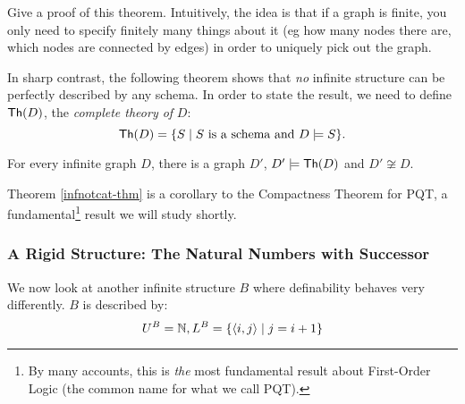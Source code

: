 \begin{aside}
    Give a proof of this theorem. Intuitively, the idea is that if a graph is finite, you only need to specify finitely many things about it (eg how many nodes there are, which nodes are connected by edges) in order to uniquely pick out the graph. 
\end{aside}

In sharp contrast, the following theorem shows that \emph{no} infinite structure can be perfectly described by any schema. In order to state the result, we need to define $\mbox{${\mathsf{Th}}(D)$}$, the \emph{complete theory of} $D$:
\[
\mbox{${\mathsf{Th}}(D)$} = \{S\mid S \mbox{ is a schema and } D\models S\}. 
\]
\begin{theorem}\label{infnotcat-thm}
For every infinite graph $D$, there is a graph $D'$, $D'\models\mbox{${\mathsf{Th}}(D)$}$ and $D'\not\cong D$.
\end{theorem}
Theorem \ref{infnotcat-thm} is a corollary to the Compactness Theorem for PQT, a fundamental\footnote{By many accounts, this is \emph{the} most fundamental result about First-Order Logic (the common name for what we call PQT).} result we will study shortly.

\subsubsection*{A Rigid Structure: The Natural Numbers with Successor}
We now look at another infinite structure $B$ where definability behaves very differently. $B$ is described by:
\[
    U^B = \mathbb{N}, L^B = \{\mbox{$\langle i,j \rangle$}\mid j=i+1\}
\]

\begin{center}
\end{center}


